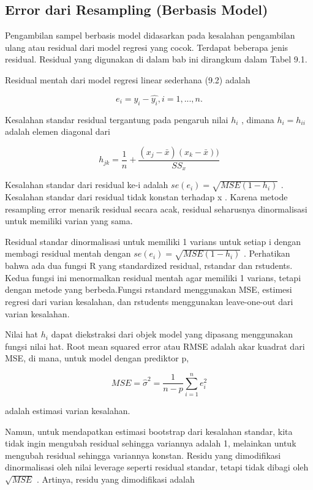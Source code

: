 \documentclass[a4paper,12pt]{article}
\theoremstyle{definition}
\begin{document}
\subsection{Error dari Resampling (Berbasis Model)}
Pengambilan sampel berbasis model didasarkan pada kesalahan pengambilan ulang atau residual dari model regresi yang cocok. Terdapat beberapa jenis residual. Residual yang digunakan di dalam bab ini dirangkum dalam Tabel 9.1.

Residual mentah dari model regresi linear sederhana (9.2) adalah 

\begin{equation*}
    e_{i} = y_{i} - \widehat{y_{i}},     i = 1,...,n.
\end{equation*}

Kesalahan standar residual tergantung pada pengaruh nilai $h_{i}$ , dimana $h_{i} = h_{ii}$ adalah elemen diagonal dari

\begin{equation*}
    h_{jk} = \frac{1}{n} + \frac{(x_{j}-\bar{x})(x_{k}-\bar{x}))}{SS_{x}}
\end{equation*}
    
Kesalahan standar dari residual ke-i adalah $se(e_{i})  = \sqrt{MSE(1-h_{i})}$ . Kesalahan standar dari residual tidak konstan terhadap x . Karena metode resampling error menarik residual secara acak, residual seharusnya dinormalisasi untuk memiliki varian yang sama. 

Residual standar dinormalisasi untuk memiliki 1 varians untuk setiap i dengan membagi residual mentah dengan $se(e_{i}) = \sqrt{MSE(1-h_{i})}$ . Perhatikan bahwa ada dua fungsi R yang standardized residual, rstandar dan rstudents. Kedua fungsi ini menormalkan residual mentah agar memiliki 1 varians, tetapi dengan metode yang berbeda.Fungsi rstandard menggunakan MSE, estimesi regresi dari varian kesalahan, dan rstudents menggunakan leave-one-out dari varian kesalahan.

Nilai hat $h_{i}$ dapat diekstraksi dari objek model yang dipasang menggunakan fungsi nilai hat. Root mean squared error atau RMSE adalah akar kuadrat dari MSE, di mana, untuk model dengan prediktor p, 

\begin{equation*}
    MSE = \widehat{\sigma }^{2} = \frac{1}{n-p}\sum_{i=1}^{n}e_{i}^{2}
\end{equation*}

adalah estimasi varian kesalahan.

Namun, untuk mendapatkan estimasi bootstrap dari kesalahan standar, kita tidak ingin mengubah residual sehingga variannya adalah 1, melainkan untuk mengubah residual sehingga variannya konstan. Residu yang dimodifikasi dinormalisasi oleh nilai leverage seperti residual standar, tetapi tidak dibagi oleh $\sqrt{MSE}$ . Artinya, residu yang dimodifikasi adalah
\end{document}
